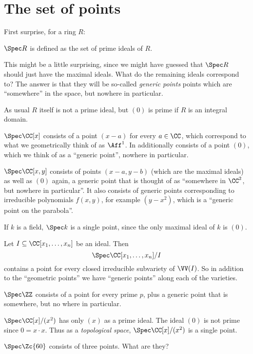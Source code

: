 \section{The set of points}

First surprise, for a ring $R$:
\begin{moral}
	$\Spec R$ is defined as the set of prime ideals of $R$.
\end{moral}

This might be a little surprising, since we might have guessed
that $\Spec R$ should just have the maximal ideals.
What do the remaining ideals correspond to?
The answer is that they will be so-called \emph{generic points}
points which are ``somewhere'' in the space, but nowhere in particular.

\begin{remark}
	As usual $R$ itself is not a prime ideal, but $(0)$
	is prime if $R$ is an integral domain.
\end{remark}

\begin{example}
	\listhack
	\begin{enumerate}[(a)]
		\ii $\Spec \CC[x]$ consists of a point $(x-a)$ for every $a \in \CC$,
		which correspond to what we geometrically think of as $\Aff^1$.
		In additionally consists of a point $(0)$,
		which we think of as a ``generic point'', nowhere in particular.

		\ii $\Spec \CC[x,y]$ consists of points $(x-a,y-b)$
		(which are the maximal ideals) as well as $(0)$ again, a generic
		point that is thought of as ``somewhere in $\CC^2$,
		but nowhere in particular''.
		It also consists of generic points corresponding to irreducible
		polynomials $f(x,y)$, for example $(y-x^2)$,
		which is a ``generic point on the parabola''.

		\ii If $k$ is a field, $\Spec k$ is a single point,
		since the only maximal ideal of $k$ is $(0)$.
	\end{enumerate}
\end{example}
\begin{example}
	Let $I \subseteq \CC[x_1, \dots, x_n]$ be an ideal.
	Then \[ \Spec \CC[x_1, \dots, x_n] /I \] contains a
	point for every closed irreducible subvariety of $\VV(I)$.
	So in addition to the ``geometric points'' we have
	``generic points'' along each of the varieties.
\end{example}
\begin{example}
	\listhack
	\begin{enumerate}[(a)]
		\ii $\Spec \ZZ$ consists of a point for every prime $p$,
		plus a generic point that is somewhere, but no where in particular.

		\ii $\Spec \CC[x] / (x^2)$ has only $(x)$ as a prime ideal.
		The ideal $(0)$ is not prime since $0 = x \cdot x$.
		Thus as a \emph{topological space},
		$\Spec \CC[x] / (x^2)$ is a single point.
		
		\ii $\Spec \Zc{60}$ consists of three points.
		What are they?
	\end{enumerate}
\end{example}

